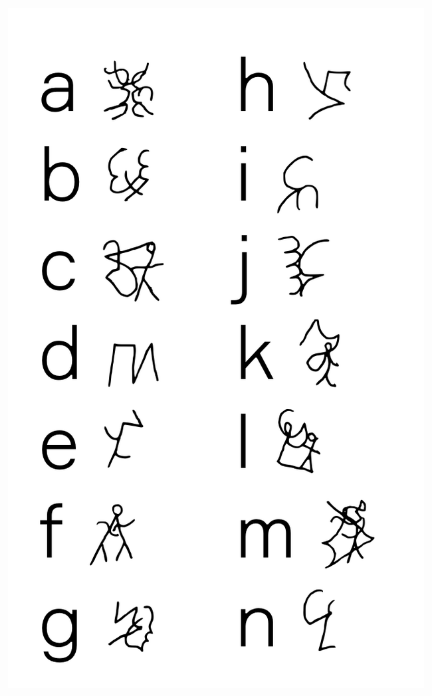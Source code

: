 \makeatletter\@openrightfalse
\movetoevenpage
\begin{absolutelynopagebreak}
\begin{vplace}
\begin{figure}[H]
\begin{adjustwidth}{-0.99cm}{}
  \centering
  \vspace*{-2cm}
  \hspace*{0.4cm}
  \includegraphics[width=110mm]{./imgs/alfa1.pdf}  
  \hfill
\end{adjustwidth}

\thispagestyle{empty}

\end{figure}
\end{vplace}

\end{absolutelynopagebreak}

